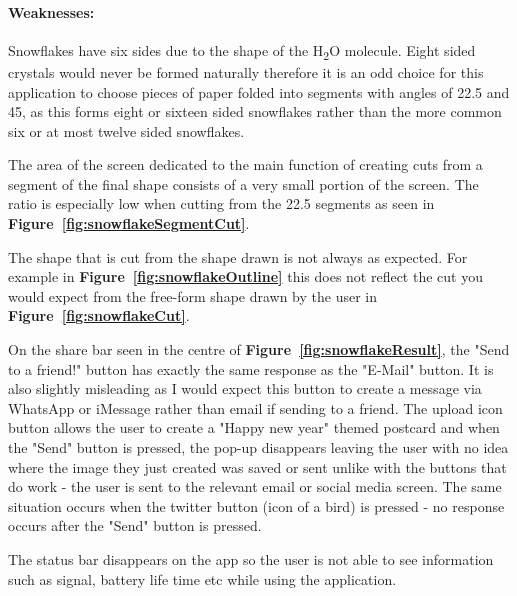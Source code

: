 \documentclass[11pt]{article}
\begin{document}
                \paragraph{Weaknesses:}
                Snowflakes have six sides due to the shape of the H\textsubscript{2}O molecule. Eight sided crystals would never be formed naturally therefore it is an odd choice for this application to choose pieces of paper folded into segments with angles of 22.5\textdegree{} and 45\textdegree{}, as this forms eight or sixteen sided snowflakes rather than the more common six or at most twelve sided snowflakes. %
                
                The area of the screen dedicated to the main function of creating cuts from a segment of the final shape consists of a very small portion of the screen. The ratio is especially low when cutting from the 22.5\textdegree{} segments as seen in \textbf{Figure~\ref{fig:snowflakeSegmentCut}}.
                
                The shape that is cut from the shape drawn is not always as expected. For example in \textbf{Figure~\ref{fig:snowflakeOutline}} this does not reflect the cut you would expect from the free-form shape drawn by the user in \textbf{Figure~\ref{fig:snowflakeCut}}.
               
                On the share bar seen in the centre of \textbf{Figure~\ref{fig:snowflakeResult}}, the "Send to a friend!" button has exactly the same response as the "E-Mail" button. It is also slightly  misleading as I would expect this button to create a message via WhatsApp or iMessage rather than email if sending to a friend. The upload icon button allows the user to create a "Happy new year" themed postcard and when the "Send" button is pressed, the pop-up disappears leaving the user with no idea where the image they just created was saved or sent unlike with the buttons that do work - the user is sent to the relevant email or social media screen. The same situation occurs when the twitter button (icon of a bird) is pressed - no response occurs after the "Send" button is pressed.
                
                The status bar disappears on the app so the user is not able to see information such as signal, battery life time etc while using the application. 
                 
\end{document}
